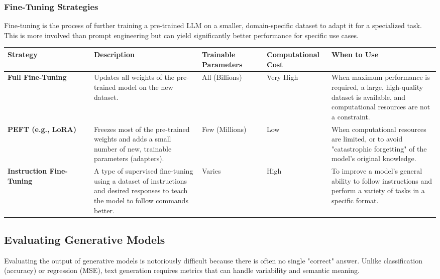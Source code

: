 \documentclass[11pt,a4paper]{article}
\begin{document}
\subsubsection{Fine-Tuning Strategies}

Fine-tuning is the process of further training a pre-trained LLM on a smaller, domain-specific dataset to adapt it for a specialized task. This is more involved than prompt engineering but can yield significantly better performance for specific use cases.

\begin{longtable}{@{}p{0.2\linewidth}p{0.25\linewidth}p{0.15\linewidth}p{0.15\linewidth}p{0.25\linewidth}@{}}
\toprule
\textbf{Strategy} & \textbf{Description} & \textbf{Trainable Parameters} & \textbf{Computational Cost} & \textbf{When to Use} \\
\midrule
\endhead
\textbf{Full Fine-Tuning} & Updates all weights of the pre-trained model on the new dataset. & All (Billions) & Very High & When maximum performance is required, a large, high-quality dataset is available, and computational resources are not a constraint. \\
\textbf{PEFT (e.g., LoRA)} & Freezes most of the pre-trained weights and adds a small number of new, trainable parameters (adapters). & Few (Millions) & Low & When computational resources are limited, or to avoid "catastrophic forgetting" of the model's original knowledge. \\
\textbf{Instruction Fine-Tuning} & A type of supervised fine-tuning using a dataset of instructions and desired responses to teach the model to follow commands better. & Varies & High & To improve a model's general ability to follow instructions and perform a variety of tasks in a specific format. \\
\bottomrule
\end{longtable}

\subsection{Evaluating Generative Models}

Evaluating the output of generative models is notoriously difficult because there is often no single "correct" answer. Unlike classification (accuracy) or regression (MSE), text generation requires metrics that can handle variability and semantic meaning.
\end{document}
